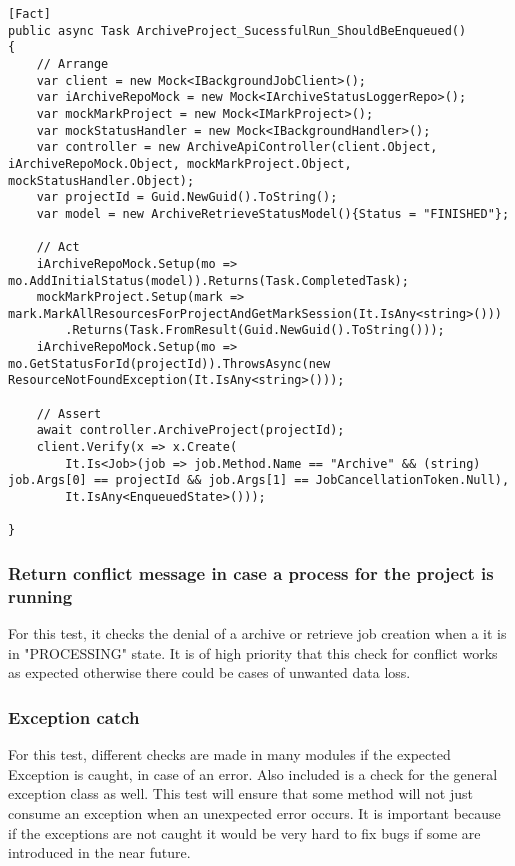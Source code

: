 \begin{lstlisting}[language={[Sharp]C}, caption={Hangfire Job creation test}, captionpos=b,label={lst:hangfireCreate}]
[Fact]
public async Task ArchiveProject_SucessfulRun_ShouldBeEnqueued()
{
    // Arrange
    var client = new Mock<IBackgroundJobClient>();
    var iArchiveRepoMock = new Mock<IArchiveStatusLoggerRepo>();
    var mockMarkProject = new Mock<IMarkProject>();
    var mockStatusHandler = new Mock<IBackgroundHandler>();
    var controller = new ArchiveApiController(client.Object, iArchiveRepoMock.Object, mockMarkProject.Object, mockStatusHandler.Object);
    var projectId = Guid.NewGuid().ToString();
    var model = new ArchiveRetrieveStatusModel(){Status = "FINISHED"}; 
    
    // Act
    iArchiveRepoMock.Setup(mo => mo.AddInitialStatus(model)).Returns(Task.CompletedTask);
    mockMarkProject.Setup(mark => mark.MarkAllResourcesForProjectAndGetMarkSession(It.IsAny<string>()))
        .Returns(Task.FromResult(Guid.NewGuid().ToString()));
    iArchiveRepoMock.Setup(mo => mo.GetStatusForId(projectId)).ThrowsAsync(new ResourceNotFoundException(It.IsAny<string>()));

    // Assert
    await controller.ArchiveProject(projectId);
    client.Verify(x => x.Create(
        It.Is<Job>(job => job.Method.Name == "Archive" && (string) job.Args[0] == projectId && job.Args[1] == JobCancellationToken.Null),
        It.IsAny<EnqueuedState>()));

}
\end{lstlisting}

\subsubsection{Return conflict message in case a process for the project is running}
For this test, it checks the denial of a archive or retrieve job creation when a it is in "PROCESSING" state. It is of high priority that this check
for conflict works as expected otherwise there could be cases of unwanted data loss. 

\subsubsection{Exception catch}
For this test, different checks are made in many modules if the expected Exception is caught, in case of an error. Also included is a check for the general
exception class as well. This test will ensure that some method will not just consume an exception when an unexpected error occurs. It is important because if 
the exceptions are not caught it would be very hard to fix bugs if some are introduced in the near future.

